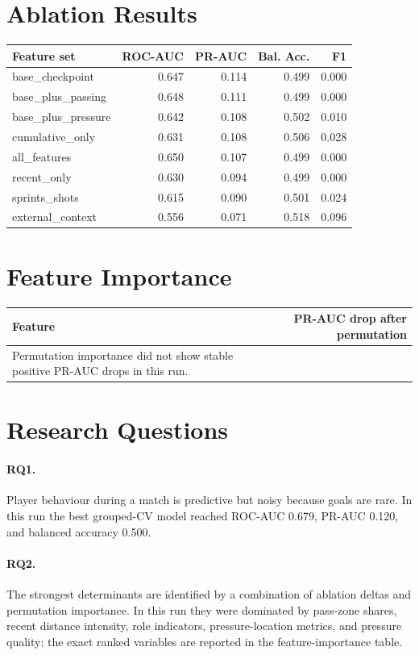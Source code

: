 \documentclass[11pt]{article}
\begin{document}
\section{Ablation Results}
\begin{longtable}{lrrrr}
\toprule
Feature set & ROC-AUC & PR-AUC & Bal. Acc. & F1 \\
\midrule
base\_checkpoint & 0.647 & 0.114 & 0.499 & 0.000 \\
base\_plus\_passing & 0.648 & 0.111 & 0.499 & 0.000 \\
base\_plus\_pressure & 0.642 & 0.108 & 0.502 & 0.010 \\
cumulative\_only & 0.631 & 0.108 & 0.506 & 0.028 \\
all\_features & 0.650 & 0.107 & 0.499 & 0.000 \\
recent\_only & 0.630 & 0.094 & 0.499 & 0.000 \\
sprints\_shots & 0.615 & 0.090 & 0.501 & 0.024 \\
external\_context & 0.556 & 0.071 & 0.518 & 0.096 \\
\bottomrule
\end{longtable}

\section{Feature Importance}
\begin{longtable}{lr}
\toprule
Feature & PR-AUC drop after permutation \\
\midrule
Permutation importance did not show stable positive PR-AUC drops in this run. \\
\bottomrule
\end{longtable}

\section{Research Questions}
\paragraph{RQ1.}
Player behaviour during a match is predictive but noisy because goals are rare. In this run the best grouped-CV model reached ROC-AUC 0.679, PR-AUC 0.120, and balanced accuracy 0.500.
\paragraph{RQ2.}
The strongest determinants are identified by a combination of ablation deltas and permutation importance. In this run they were dominated by pass-zone shares, recent distance intensity, role indicators, pressure-location metrics, and pressure quality; the exact ranked variables are reported in the feature-importance table.
\end{document}
